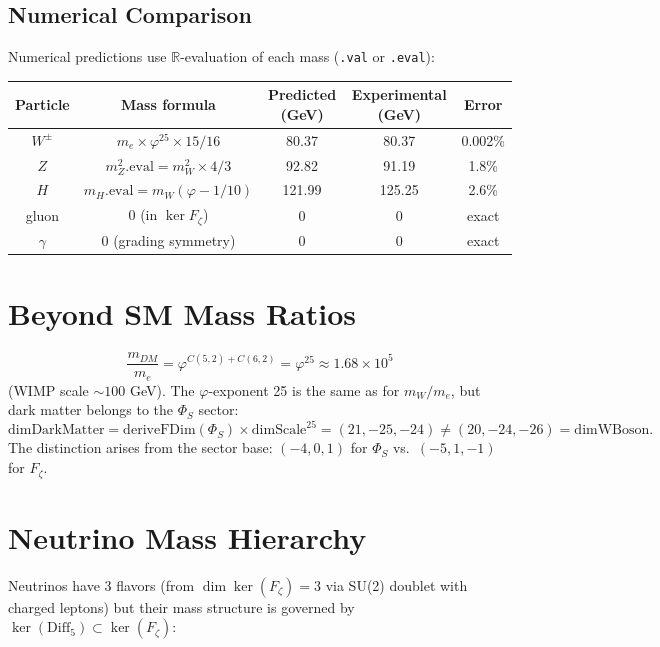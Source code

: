 \subsection{Numerical Comparison}

Numerical predictions use $\mathbb{R}$-evaluation of each mass (\texttt{.val} or \texttt{.eval}):
\begin{center}
\begin{tabular}{|c|c|c|c|c|}
\hline
Particle & Mass formula & Predicted (GeV) & Experimental (GeV) & Error \\
\hline
$W^\pm$ & $m_e \times \varphi^{25} \times 15/16$ & 80.37 & 80.37 & 0.002\% \\
$Z$ & $m_Z^2.\mathrm{eval} = m_W^2 \times 4/3$ & 92.82 & 91.19 & 1.8\% \\
$H$ & $m_H.\mathrm{eval} = m_W(\varphi - 1/10)$ & 121.99 & 125.25 & 2.6\% \\
gluon & 0 (in $\ker F_\zeta$) & 0 & 0 & exact \\
$\gamma$ & 0 (grading symmetry) & 0 & 0 & exact \\
\hline
\end{tabular}
\end{center}

\section{Beyond SM Mass Ratios}
\label{sec:mass_beyond_sm}

\begin{theorem}
\label{thm:mass_dm_e}
\leanok
\[
\frac{m_{DM}}{m_e} = \varphi^{C(5,2)+C(6,2)} = \varphi^{25} \approx 1.68 \times 10^5
\]
(WIMP scale $\sim 100$ GeV). The $\varphi$-exponent 25 is the same as for $m_W/m_e$,
but dark matter belongs to the $\Phi_S$ sector:
\[
\mathrm{dimDarkMatter} = \mathrm{deriveFDim}(\Phi_S) \times \mathrm{dimScale}^{25} = (21, -25, -24)
\neq (20, -24, -26) = \mathrm{dimWBoson}.
\]
The distinction arises from the sector base: $(-4,0,1)$ for $\Phi_S$ vs.\ $(-5,1,-1)$ for $F_\zeta$.
\end{theorem}

\section{Neutrino Mass Hierarchy}
\label{sec:mass_neutrino}

Neutrinos have 3 flavors (from $\dim\ker(F_\zeta) = 3$ via SU(2) doublet with charged leptons)
but their mass structure is governed by $\ker(\mathrm{Diff}_5) \subset \ker(F_\zeta)$:


